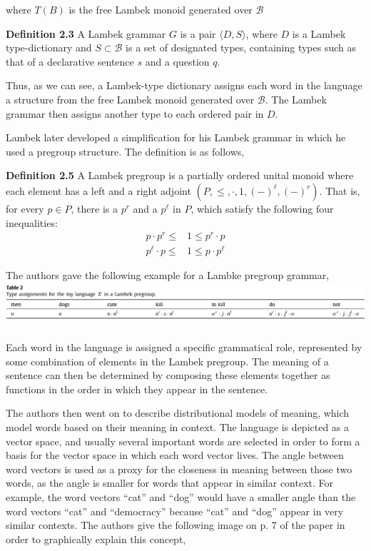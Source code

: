 \documentclass[11pt, reqno]{amsart}
\theoremstyle{plain}
\theoremstyle{definition}
\theoremstyle{example}
\begin{document}
where $T(B)$ is the free Lambek monoid generated over $\mathcal{B}$

\par
\textbf{Definition 2.3} \cite{lambekvlambek} A Lambek grammar $G$ is a pair $\langle D, S \rangle$, where $D$ is a Lambek type-dictionary and $S \subset \mathcal{B}$ is a set of designated types, containing types such as that of a declarative sentence $s$ and a question $q$.

\par
Thus, as we can see, a Lambek-type dictionary assigns each word in the language a structure from the free Lambek monoid generated over $\mathcal{B}$. The Lambek grammar then assigns another type to each ordered pair in $D$.

\par
Lambek later developed a simplification for his Lambek grammar in which he used a pregroup structure. The definition is as follows,

\par
\textbf{Definition 2.5} \cite{lambekvlambek} A Lambek pregroup is a partially ordered unital monoid where each element has a left and a right adjoint $(P, \leq, \cdot, 1, (-)^{\ell}, (-)^r)$. That is, for every $p \in P$, there is a $p^r$ and a $p^{\ell}$ in $P$, which satisfy the following four inequalities:
\begin{align*}
p \cdot p^r \leq &1 \leq p^r \cdot p\\
p^{\ell} \cdot p \leq &1 \leq p \cdot p^{\ell}
\end{align*}

\par
The authors gave the following example for a Lambke pregroup grammar,\\
\includegraphics[scale=0.55]{lambek_pregroup}

\par
Each word in the language is assigned a specific grammatical role, represented by some combination of elements in the Lambek pregroup. The meaning of a sentence can then be determined by composing these elements together as functions in the order in which they appear in the sentence.

\par
The authors then went on to describe distributional models of meaning, which model words based on their meaning in context. The language is depicted as a vector space, and usually several important words are selected in order to form a basis for the vector space in which each word vector lives. The angle between word vectors is used as a proxy for the closeness in meaning between those two words, as the angle is smaller for words that appear in similar context. For example, the word vectors ``cat'' and ``dog'' would have a smaller angle than the word vectors ``cat'' and ``democracy'' because ``cat'' and ``dog'' appear in very similar contexts. The authors give the following image on p. 7 of the paper in order to graphically explain this concept,\\
\end{document}
